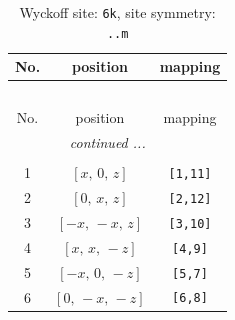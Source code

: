 \documentclass[fleqn,8pt]{jsarticle}
\begin{document}
\renewcommand{\arraystretch}{1.2}
\begin{longtable}{ccc}
\caption{Wyckoff site: {\tt 6k}, site symmetry: {\tt ..m}}
 \\
 \hline \hline
No. & position & mapping \\ \hline \endfirsthead

\multicolumn{2}{l}{\tablename\ \thetable{}} \\
 \hline \hline
No. & position & mapping \\ \hline \endhead

 \hline \hline
\multicolumn{2}{r}{\footnotesize\it continued ...} \\ \endfoot

 \hline \hline
\multicolumn{2}{r}{} \\ \endlastfoot

1 & $\left[ x,\, 0,\, z \right]$ & {\tt [1,11]} \\ \hline
2 & $\left[ 0,\, x,\, z \right]$ & {\tt [2,12]} \\ \hline
3 & $\left[ - x,\, - x,\, z \right]$ & {\tt [3,10]} \\ \hline
4 & $\left[ x,\, x,\, - z \right]$ & {\tt [4,9]} \\ \hline
5 & $\left[ - x,\, 0,\, - z \right]$ & {\tt [5,7]} \\ \hline
6 & $\left[ 0,\, - x,\, - z \right]$ & {\tt [6,8]} \\
\end{longtable}
\renewcommand{\arraystretch}{1.2}
\end{document}
